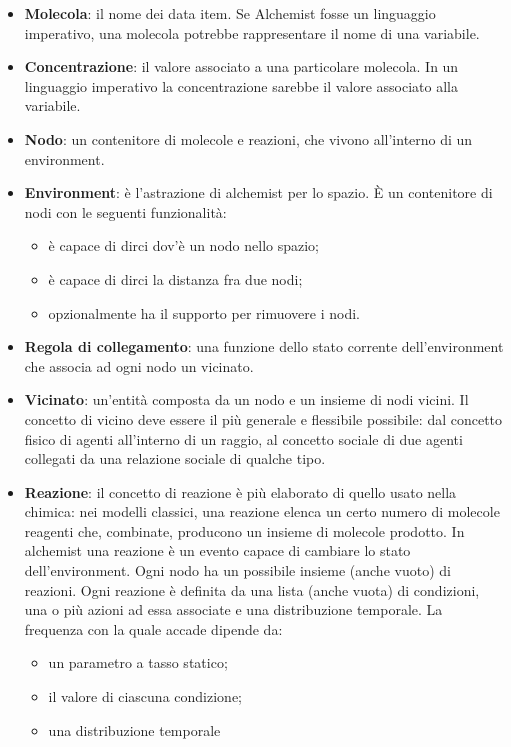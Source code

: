 \documentclass[12pt,a4paper,openright,twoside]{book}
\begin{document}
\begin{itemize}
    \item \textbf{Molecola}: il nome dei data item. Se Alchemist fosse un linguaggio imperativo, una molecola potrebbe rappresentare il nome di una variabile. 
    \item \textbf{Concentrazione}: il valore associato a una particolare molecola. In un linguaggio imperativo la concentrazione sarebbe il valore associato alla variabile. 
    \item \textbf{Nodo}: un contenitore di molecole e reazioni, che vivono all'interno di un environment. 
    \item \textbf{Environment}: è l'astrazione di alchemist per lo spazio. È un contenitore di nodi con le seguenti funzionalità: 
    \begin{itemize}
        \item è capace di dirci dov'è un nodo nello spazio;
        \item è capace di dirci la distanza fra due nodi;
        \item opzionalmente ha il supporto per rimuovere i nodi.
    \end{itemize}
    \item \textbf{Regola di collegamento}: una funzione dello stato corrente dell'environment che associa ad ogni nodo un vicinato. 
    \item \textbf{Vicinato}: un'entità composta da un nodo e un insieme di nodi vicini. Il concetto di vicino deve essere il più generale e flessibile possibile: dal concetto fisico di agenti all'interno di un raggio, al concetto sociale di due agenti collegati da una relazione sociale di qualche tipo. 
    \item \textbf{Reazione}: il concetto di reazione è più elaborato di quello usato nella chimica: nei modelli classici, una reazione elenca un certo numero di molecole reagenti che, combinate, producono un insieme di molecole prodotto. In alchemist una reazione è un evento capace di cambiare lo stato dell'environment. Ogni nodo ha un possibile insieme (anche vuoto) di reazioni. Ogni reazione è definita da una lista (anche vuota) di condizioni, una o più azioni ad essa associate e una distribuzione temporale. La frequenza con la quale accade dipende da:
    \begin{itemize}
        \item un parametro a tasso statico; 
        \item il valore di ciascuna condizione; 
        \item una distribuzione temporale

\end{itemize}
\end{itemize}
\end{document}
